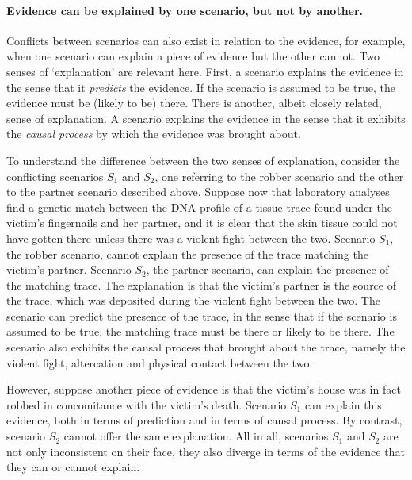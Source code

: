 \documentclass[10pt]{article}
\begin{document}
\paragraph{Evidence can be explained by one scenario, but not by another.} 
Conflicts between scenarios can also exist in relation to the evidence, for example, when one scenario 
can explain a piece of evidence but the other cannot. Two senses of `explanation' are relevant here. First, 
a scenario explains the evidence in the sense that it \textit{predicts} the evidence. If the 
scenario is assumed to be true, the evidence must be (likely to be) there. 
There is another, albeit closely related, sense of explanation. 
A scenario explains the evidence in the sense that it exhibits the \textit{causal process} by which the evidence 
was brought about. 


To understand the difference between the two senses of explanation, consider the conflicting scenarios $S_1$ and $S_2$, one referring 
to the robber scenario and the other to the partner scenario described above. 
Suppose now that laboratory analyses find a genetic match between the DNA profile of a tissue trace found under 
the victim's fingernails and her partner, and it is clear that the skin tissue could not have gotten there unless there was 
a violent fight between the two. Scenario $S_1$, the robber scenario, cannot explain the presence of the trace matching the victim's 
partner. Scenario $S_2$, the partner scenario, can explain the presence of the matching trace. The explanation is that the victim's partner is the 
source of the trace, which was deposited during the violent fight between the two. The scenario can predict 
the presence of the trace, in the sense that if the scenario is assumed to be true, the matching trace must be there or 
likely to be there. The scenario also exhibits the causal process that brought about the trace, namely the violent fight, altercation 
and physical contact between the two. 

However, suppose another piece of evidence 
is that the victim's house was in fact robbed in concomitance with the victim's death. 
Scenario $S_1$ can explain this evidence, both in terms of prediction and in terms of causal 
process. By contrast, scenario $S_2$ cannot offer the same explanation. 
 All in all, scenarios $S_1$ and $S_2$ 
are not only inconsistent on their face, they also diverge
in terms of the evidence that they can or cannot explain.
\end{document}
